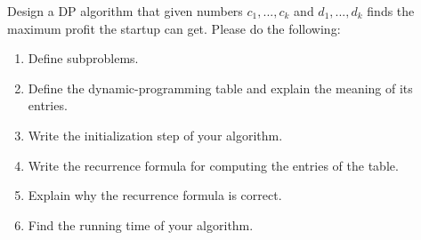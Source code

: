\hop
Design a DP algorithm that given numbers $c_1, ..., c_k$ and $d_1, ..., d_k$ finds the maximum profit the startup can get. Please do the following:
\begin{enumerate}
    \item Define subproblems. 
    \item Define the dynamic-programming table and explain the meaning of its entries. 
    \item Write the initialization step of your algorithm.
    \item Write the recurrence formula for computing the entries of the table.
    \item Explain why the recurrence formula is correct. 
    \item Find the running time of your algorithm.
\end{enumerate}
\partbreak
